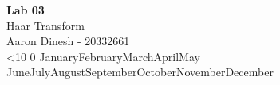 \documentclass{article}
\author{Aaron Dinesh}
\date{\today}
\renewcommand{\today}{\ifnum\number\day<10 0\fi \number\day \space%
\ifcase \month \or January\or February\or March\or April\or May%
\or June\or July\or August\or September\or October\or November\or December\fi \space%
\number \year}
\begin{document}
    \fancyfoot{}


    \begin{titlepage}
        \vspace*{\fill}
        \begin{center}
          {\Huge \textbf{Lab 03}}\\[0.5cm]
          {\Large Haar Transform}\\[0.4cm]
          {\Large Aaron Dinesh - 20332661}\\[0.3cm]
          \today
        \end{center}
        \vspace*{\fill}
    \end{titlepage}
    \newpage
    
    
    
    
    
\end{document}
